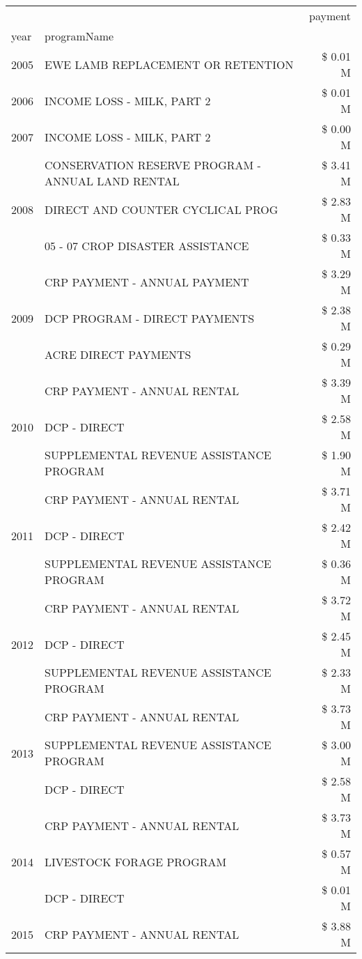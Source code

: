 \begin{tabular}{llr}
\toprule
 &  & payment \\
year & programName &  \\
\midrule
2005 & EWE LAMB REPLACEMENT OR RETENTION & \$ 0.01 M \\
\cline{1-3}
2006 & INCOME LOSS - MILK, PART 2 & \$ 0.01 M \\
\cline{1-3}
2007 & INCOME LOSS - MILK, PART 2 & \$ 0.00 M \\
\cline{1-3}
\multirow[t]{3}{*}{2008} & CONSERVATION RESERVE PROGRAM - ANNUAL LAND RENTAL & \$ 3.41 M \\
 & DIRECT AND COUNTER CYCLICAL PROG & \$ 2.83 M \\
 & 05 - 07 CROP DISASTER ASSISTANCE & \$ 0.33 M \\
\cline{1-3}
\multirow[t]{3}{*}{2009} & CRP PAYMENT - ANNUAL PAYMENT & \$ 3.29 M \\
 & DCP PROGRAM - DIRECT PAYMENTS & \$ 2.38 M \\
 & ACRE DIRECT PAYMENTS & \$ 0.29 M \\
\cline{1-3}
\multirow[t]{3}{*}{2010} & CRP PAYMENT - ANNUAL RENTAL & \$ 3.39 M \\
 & DCP - DIRECT & \$ 2.58 M \\
 & SUPPLEMENTAL REVENUE ASSISTANCE PROGRAM & \$ 1.90 M \\
\cline{1-3}
\multirow[t]{3}{*}{2011} & CRP PAYMENT - ANNUAL RENTAL & \$ 3.71 M \\
 & DCP - DIRECT & \$ 2.42 M \\
 & SUPPLEMENTAL REVENUE ASSISTANCE PROGRAM & \$ 0.36 M \\
\cline{1-3}
\multirow[t]{3}{*}{2012} & CRP PAYMENT - ANNUAL RENTAL & \$ 3.72 M \\
 & DCP - DIRECT & \$ 2.45 M \\
 & SUPPLEMENTAL REVENUE ASSISTANCE PROGRAM & \$ 2.33 M \\
\cline{1-3}
\multirow[t]{3}{*}{2013} & CRP PAYMENT - ANNUAL RENTAL & \$ 3.73 M \\
 & SUPPLEMENTAL REVENUE ASSISTANCE PROGRAM & \$ 3.00 M \\
 & DCP - DIRECT & \$ 2.58 M \\
\cline{1-3}
\multirow[t]{3}{*}{2014} & CRP PAYMENT - ANNUAL RENTAL & \$ 3.73 M \\
 & LIVESTOCK FORAGE PROGRAM & \$ 0.57 M \\
 & DCP - DIRECT & \$ 0.01 M \\
\cline{1-3}
\multirow[t]{3}{*}{2015} & CRP PAYMENT - ANNUAL RENTAL & \$ 3.88 M \\

\end{tabular}
